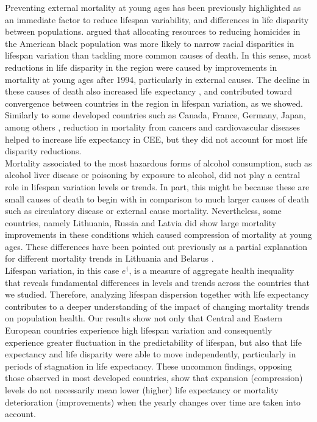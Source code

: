\documentclass{article}
\begin{document}
\begin{spacing}{1.5}
Preventing external mortality at young ages has been previously highlighted as an immediate factor to reduce lifespan variability, and differences in life disparity between populations. \citet{firebaugh2014lifespans} argued that allocating resources to reducing homicides in the American black population was more likely to narrow racial disparities in lifespan variation than tackling more common causes of death. In this sense, most reductions in life disparity in the region were caused by improvements in mortality at young ages after 1994, particularly in external causes. The decline in these causes of death also increased life expectancy \citep{trias2017contribution}, and contributed toward convergence between countries in the region in lifespan variation, as we showed. Similarly to some developed countries such as Canada, France, Germany, Japan, among others \citep{seligman2016equity}, reduction in mortality from cancers and cardiovascular diseases helped to increase life expectancy in CEE, but they did not account for most life disparity reductions.\\

Mortality associated to the most hazardous forms of alcohol consumption, such as alcohol liver disease or poisoning by exposure to alcohol, did not play a central role in lifespan variation levels or trends. In part, this might be because these are small causes of death to begin with in comparison to much larger causes of death such as circulatory disease or external cause mortality. Nevertheless, some countries, namely Lithuania, Russia and Latvia did show large mortality improvements in these conditions which caused compression of mortality at young ages. These differences have been pointed out previously as a partial explanation for different mortality trends in Lithuania and Belarus \citep{grigoriev2015spatial}.\\

Lifespan variation, in this case $e^\dagger$, is a measure of aggregate health inequality that reveals fundamental differences in levels and trends across the countries that we studied. Therefore, analyzing lifespan dispersion together with life expectancy contributes to a deeper understanding of the impact of changing mortality trends on population health. Our results show not only that Central and Eastern European countries experience high lifespan variation and consequently experience greater fluctuation in the predictability of lifespan, but also that life expectancy and life disparity were able to move independently, particularly in periods of stagnation in life expectancy. These uncommon findings, opposing those observed in most developed countries, show that expansion (compression) levels do not necessarily mean lower (higher) life expectancy  or mortality deterioration (improvements) when the yearly changes over time are taken into account. \\


\end{spacing}
\end{document}
